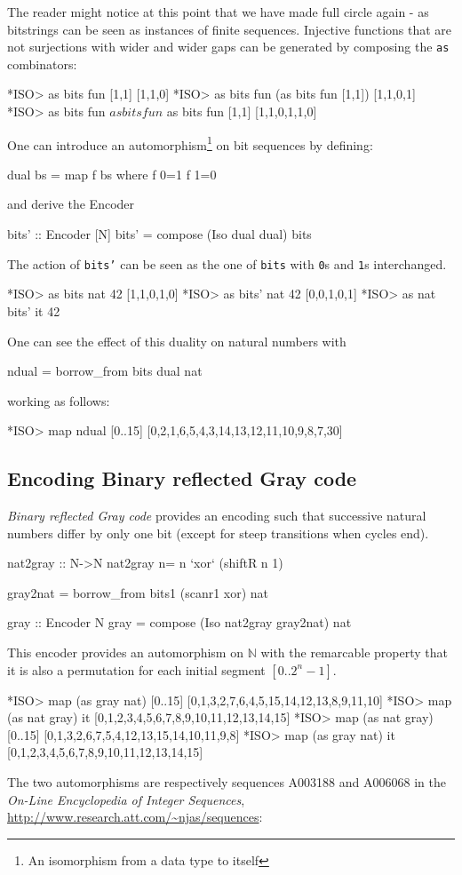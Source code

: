 \documentclass[]{INCLUDES/llncs}
\begin{document}
The reader might notice at this point that we have
made full circle again - as bitstrings can be seen as
instances of finite sequences. 
Injective functions that are not surjections 
with wider and wider gaps can be generated
by composing the {\tt as} combinators:
\begin{codex}
*ISO> as bits fun [1,1]
[1,1,0]
*ISO> as bits fun (as bits fun [1,1])
[1,1,0,1]
*ISO> as bits fun $ as bits fun $ as bits fun [1,1]
[1,1,0,1,1,0]
\end{codex}

One can introduce an automorphism\footnote{An isomorphism from a data type to
itself} on bit sequences by defining:
\begin{code}
dual bs = map f bs where
  f 0=1
  f 1=0
\end{code}
and derive the Encoder
\begin{code}
bits' :: Encoder [N]
bits' = compose (Iso dual dual) bits
\end{code}
The action of {\tt bits'} can be seen as the one of {\tt bits} with {\tt 0}s
and {\tt 1}s interchanged.
\begin{codex}
*ISO> as bits nat 42
[1,1,0,1,0]
*ISO> as bits' nat 42
[0,0,1,0,1]
*ISO> as nat bits' it
42
\end{codex}
One can see the effect of this duality on natural numbers with
\begin{code}
ndual = borrow_from bits dual nat
\end{code}
working as follows:
\begin{codex}
*ISO> map ndual [0..15]
[0,2,1,6,5,4,3,14,13,12,11,10,9,8,7,30]
\end{codex}

\subsection{Encoding Binary reflected Gray code}
{\em Binary reflected Gray code}
provides an encoding such that successive natural numbers differ by only one bit
(except for steep transitions when cycles end).
\begin{code}
nat2gray :: N->N
nat2gray n= n `xor` (shiftR n 1)

gray2nat = borrow_from bits1 (scanr1 xor) nat

gray :: Encoder N
gray = compose (Iso nat2gray gray2nat) nat
\end{code}
This encoder provides an automorphism on $\mathbb{N}$ with the remarcable
property that it is also a permutation for each initial segment $[0..2^n-1]$.
\begin{codex}
*ISO> map (as gray nat) [0..15]
[0,1,3,2,7,6,4,5,15,14,12,13,8,9,11,10]
*ISO> map (as nat gray) it
[0,1,2,3,4,5,6,7,8,9,10,11,12,13,14,15]
*ISO> map (as nat gray) [0..15]
[0,1,3,2,6,7,5,4,12,13,15,14,10,11,9,8]
*ISO> map (as gray nat) it
[0,1,2,3,4,5,6,7,8,9,10,11,12,13,14,15]
\end{codex}
The two automorphisms are respectively sequences A003188 and A006068 in the
{\em On-Line Encyclopedia of Integer Sequences}, 
\url{http://www.research.att.com/~njas/sequences}:
\end{document}
